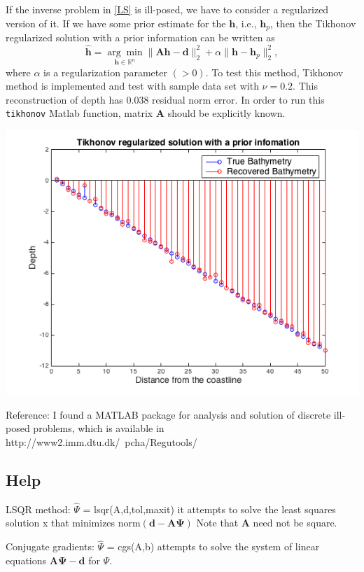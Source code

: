 If the inverse problem in \eqref{LS} is ill-posed, we have to consider a regularized version of it. If we have some prior estimate for the $\mathbf{h}$, i.e., $\mathbf{h}_p$, then the Tikhonov regularized solution with a prior information can be written as
$$
\mathbf{\hat{h}} = \underset{\mathbf{h} \in \mathbb{R}^n}{\arg \min} \|  \mathbf{A}\mathbf{h} -  \mathbf{d} \|_2^2  +  \alpha \| \mathbf{h} -  \mathbf{h}_p\|_2^2,
$$
where $\alpha$ is a regularization parameter $(>0)$. To test this method, Tikhonov method is implemented and test with sample data set with $\nu = 0.2$. This reconstruction of depth has 0.038 residual norm error. In order to run this \verb|tikhonov| Matlab function, matrix $\mathbf{A}$ should be explicitly known.

\begin{center}
\includegraphics[scale=0.6]{img/Tikhnove_reg.png} 
\end{center}

Reference: I found a MATLAB package for analysis and solution of discrete ill-posed problems, which is available in http://www2.imm.dtu.dk/~pcha/Regutools/\\

\subsection{Help}

LSQR method: $\hat{\Psi}$ = lsqr(A,d,tol,maxit) it attempts to solve the least squares solution x that minimizes norm$(\mathbf{d}-\mathbf{A\Psi})$ Note that $\mathbf{A}$ need not be square.


Conjugate gradients: $\hat{\Psi}$ = cgs(A,b) attempts to solve the system of linear equations $\mathbf{A}\mathbf{\Psi} -  \mathbf{d}$ for $\Psi$.


